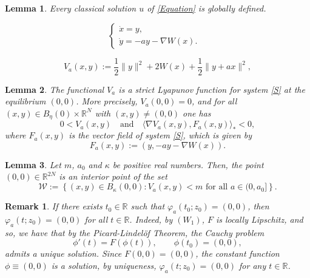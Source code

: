 \documentclass[10pt,a4paper]{amsart}
\newtheorem{lemma}{Lemma}
\newtheorem{remark}{Remark}
\begin{document}
\begin{lemma}\label{L1}
	Every classical solution $u$ of \eqref{Equation} is globally defined.
\end{lemma}

\begin{equation}\label{S}
	\left\{\begin{array}{ll} 
		\dot{x} = y, & \\ 
		\dot{y} = -a y - \nabla W(x). & 
	\end{array}\right.
\end{equation}

\begin{equation}\label{Va}
	V_a(x,y) := \frac{1}{2} \|y\|^2 + 2W(x) + \frac{1}{2} \|y + a x\|^2,
\end{equation}

\begin{lemma}\label{L2}
	The functional $V_a$ is a strict Lyapunov function for system \eqref{S} at the equilibrium $(0,0)$. More precisely, $V_a(0,0)=0$, and for all $(x,y)\in B_\eta(0)\times \mathbb{R}^N$ with $(x,y)\neq(0,0)$ one has
	$$
	0 < V_a(x,y)\quad\text{and}\quad\langle \nabla V_a(x,y), F_a(x,y) \rangle_* < 0,
	$$
	where $F_a(x,y)$ is the vector field of system \eqref{S}, which is given by
	\begin{equation}\label{VectorField}
		F_a(x,y) := (y, -ay - \nabla W(x)).
	\end{equation}
\end{lemma}

\begin{lemma}\label{L3}
Let $m$, $a_0$ and $\kappa$ be positive real numbers. Then, the point $ (0,0) \in \mathbb{R}^{2N} $ is an interior point of the set
$$
\mathcal{W} := \left\{ (x,y) \in B_\kappa(0,0) : V_a(x,y) < m \text{ for all } a \in (0, a_0] \right\}.
$$
\end{lemma}

\begin{remark}\label{OBS2} \rm
If there exists $t_0\in\mathbb{R}$ such that $\varphi_a(t_0;z_0)=(0,0)$, then $\varphi_a(t;z_0)=(0,0)$ for all $t\in \mathbb{R}$. Indeed, by \hyperlink{W1}{$(W_1)$}, $F$ is locally Lipschitz, and so, we have that by the Picard-Lindelöf Theorem, the Cauchy problem
$$
\phi'(t)=F(\phi(t)),\qquad \phi(t_0)=(0,0),
$$
admits a unique solution. Since $F(0,0)=(0,0)$, the constant function $\phi\equiv(0,0)$ is a solution, by uniqueness, $\varphi_a(t;z_0)=(0,0)$ for any $t\in \mathbb{R}$.
\end{remark}
\end{document}
